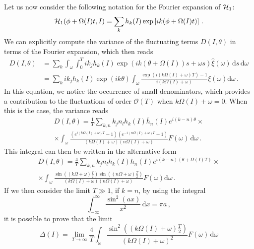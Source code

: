 Let us now consider the following notation for the Fourier expansion of $\mathcal{H}_1$:
\begin{equation}
    \mathcal{H}_1(\phi + \Omega(I)t, I) = \sum_k h_k(I)\exp\left[ik(\phi+\Omega(I)t)\right]\,.
\end{equation}
We can explicitly compute the variance of the fluctuating terms $D(I,\theta)$ in terms of the Fourier expansion, which then reads
\begin{equation}
    \begin{aligned}
    D(I,\theta) &= \sum_k \int_\omega \int_0^T ik_j h_k(I) \exp(ik(\theta+\Omega(I))s+\omega s)\hat \xi(\omega)\,\mathrm{d}s\, \mathrm{d}\omega \\
    &= \sum_k i k_j h_k(I) \exp(ik\theta)\int_\omega\frac{\exp(i(k\Omega(I)+\omega )T)-1}{i(k\Omega(I)+\omega)}\hat \xi(\omega) \mathrm{d}\omega \,.
    \end{aligned}
\end{equation}
In this equation, we notice the occurrence of small denominators, which provides a contribution to the fluctuations of order $\mathcal{O}(T)$ when $k\Omega(I) + \omega = 0$. When this is the case, the variance reads
\begin{multline}
    D(I,\theta) = \frac{1}{T}\sum_{k,n} k_j n_l h_k(I) \overline{h}_n(I) e^{i(k-n)\theta}\times
    \\ \times\int_\omega\frac{\left(e^{i(k\Omega(I)+\omega )T}-1\right)\left(e^{-i(n\Omega(I)+\omega )T}-1\right)}{(k\Omega(I)+\omega)(n\Omega(I)+\omega)}F(\omega)\,\mathrm{d}\omega \,.
\end{multline}
This integral can then be written in the alternative form
\begin{multline}
    D(I,\theta)=\frac{4}{T}\sum_{k,n} k_j n_l h_k(I) \overline{h}_n(I) e^{i(k-n)(\theta+\Omega(I)T)}\times\\
    \times\int_\omega\frac{\sin\left((k\Omega+\omega)\frac{T}{2}\right)\sin\left((n\Omega+\omega)\frac{T}{2}\right)}{(k\Omega(I)+\omega)(n\Omega(I)+\omega)}F(\omega) \mathrm{d}\omega\,.
\end{multline}
If we then consider the limit $T\gg 1$, if $k=n$, by using the integral
\begin{equation}
    \int_{-\infty}^\infty \frac{\sin^2(ax)}{x^2}\,\mathrm{d}x=\pi a\,,
\end{equation}
it is possible to prove that the limit
\begin{equation}
    \Delta(I)=\lim_{T\to\infty}\frac{4}{T} \int_\omega\frac{\sin^2\left((k\Omega(I)+\omega)\frac{T}{2}\right)}{(k\Omega(I)+\omega)^2}F(\omega)\,\mathrm{d}\omega
\end{equation}
